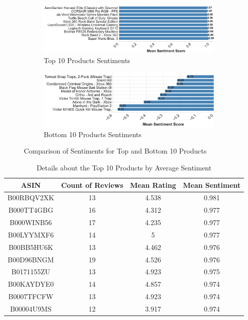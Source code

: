 \begin{figure}[h]
  \centering
  \begin{subfigure}{0.48\textwidth}
      \includegraphics[width=\textwidth]{Figures/Top_10_Products_Sentiments.pdf} %
      \caption{Top 10 Products Sentiments}
      \label{fig:top 10 products sentiments}
  \end{subfigure}
  \hfill
  \begin{subfigure}{0.48\textwidth}
      \includegraphics[width=\textwidth]{Figures/Bottom_10_Products_Sentiments.pdf} %
      \caption{Bottom 10 Products Sentiments}
      \label{fig:bottom 10 products sentiments}
  \end{subfigure}
  \caption{Comparison of Sentiments for Top and Bottom 10 Products}
  \label{fig:comparison_sentiments_top_10s}
\end{figure}

\begin{table}[h]
  \centering
  \begin{tabular}{cccc}
      \hline
      \textbf{ASIN} & \textbf{Count of Reviews} & \textbf{Mean Rating} & \textbf{Mean Sentiment} \\
      \hline
      B00RBQV2XK & 13 & 4.538 & 0.981 \\
      B000TT4GBG & 16 & 4.312 & 0.977 \\
      B000WINB56 & 17 & 4.235 & 0.977 \\
      B00LYYMXF6 & 14 & 5     & 0.977 \\
      B00BB5HU6K & 13 & 4.462 & 0.976 \\
      B00D96BNGM & 19 & 4.526 & 0.976 \\
      B0171155ZU & 13 & 4.923 & 0.975 \\
      B00KAYDYE0 & 14 & 4.857 & 0.974 \\
      B0007TFCFW & 13 & 4.923 & 0.974 \\
      B00004U9MS & 12 & 3.917 & 0.974 \\
      \hline
  \end{tabular}
  \caption{Details about the Top 10 Products by Average Sentiment}
  \label{tab:top 10 products statistics}
\end{table}


